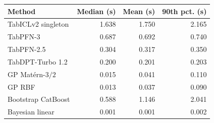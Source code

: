 \begin{tabular}{lrrr}
\toprule Method & Median (s) & Mean (s) & 90th pct. (s) \\
\midrule
TabICLv2 singleton & 1.638 & 1.750 & 2.165 \\
TabPFN-3 & 0.687 & 0.692 & 0.740 \\
TabPFN-2.5 & 0.304 & 0.317 & 0.350 \\
TabDPT-Turbo 1.2 & 0.200 & 0.201 & 0.203 \\
GP Mat\'ern-$3/2$ & 0.015 & 0.041 & 0.110 \\
GP RBF & 0.013 & 0.037 & 0.090 \\
Bootstrap CatBoost & 0.588 & 1.146 & 2.041 \\
Bayesian linear & 0.001 & 0.001 & 0.002 \\
\bottomrule
\end{tabular}
